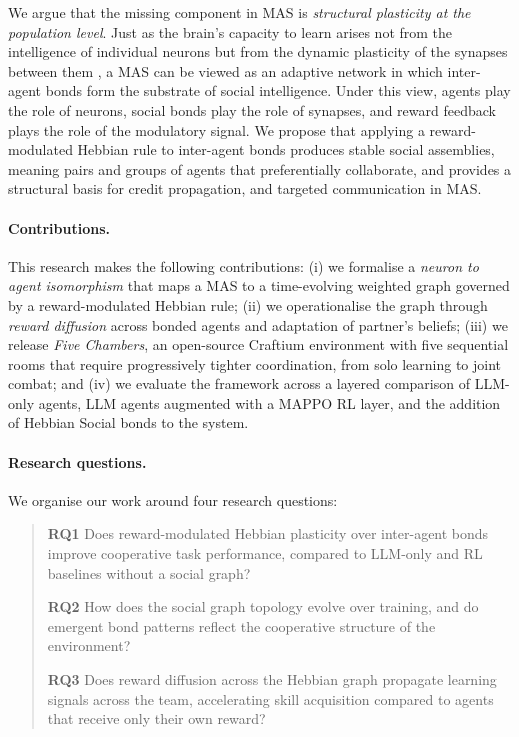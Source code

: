 We argue that the missing component in MAS is \emph{structural plasticity at the population level}. Just as the brain's capacity to learn arises not from the intelligence of individual neurons but from the dynamic plasticity of the synapses between them \cite{hebb2005organization, kusmierz2017learning}, a MAS can be viewed as an adaptive network in which inter-agent bonds form the substrate of social intelligence. Under this view, agents play the role of neurons, social bonds play the role of synapses, and reward feedback plays the role of the modulatory signal. We propose that applying a reward-modulated Hebbian rule to inter-agent bonds produces stable social assemblies, meaning pairs and groups of agents that preferentially collaborate, and provides a structural basis for credit propagation, and targeted communication in MAS.

\paragraph{Contributions.} This research makes the following contributions: (i) we formalise a \emph{neuron to agent isomorphism} that maps a MAS to a time-evolving weighted graph governed by a reward-modulated Hebbian rule; (ii) we operationalise the graph through \emph{reward diffusion} across bonded agents and adaptation of partner's beliefs; (iii) we release \emph{Five Chambers}, an open-source Craftium environment with five sequential rooms that require progressively tighter coordination, from solo learning to joint combat; and (iv) we evaluate the framework across a layered comparison of LLM-only agents, LLM agents augmented with a MAPPO RL layer, and the addition of Hebbian Social bonds to the system.

\paragraph{Research questions.} We organise our work around four research questions:
\begin{quote}
\textbf{RQ1} Does reward-modulated Hebbian plasticity over inter-agent bonds improve cooperative task performance, compared to LLM-only and RL baselines without a social graph?

\textbf{RQ2} How does the social graph topology evolve over training, and do emergent bond patterns reflect the cooperative structure of the environment?

\textbf{RQ3} Does reward diffusion across the Hebbian graph propagate learning signals across the team, accelerating skill acquisition compared to agents that receive only their own reward?
\end{quote}
